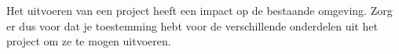 
Het uitvoeren van een project heeft een impact op de bestaande omgeving. Zorg er dus voor dat je toestemming hebt voor de verschillende onderdelen uit het project om ze te mogen uitvoeren.
